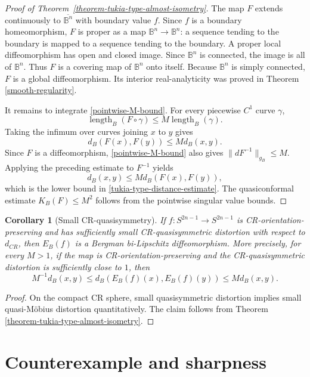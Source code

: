 \documentclass[11pt]{article}
\newtheorem{corollary}[theorem]{Corollary}
\theoremstyle{definition}
\theoremstyle{remark}
\theoremstyle{definition}
\newcommand{\B}{\mathbb B}
\begin{document}
\begin{proof}[Proof of Theorem~\ref{theorem-tukia-type-almost-isometry}]
The map \(F\) extends continuously to \(\overline{\B^n}\) with boundary value
\(f\).  Since \(f\) is a boundary homeomorphism, \(F\) is proper as a map
\(\B^n\to\B^n\): a sequence tending to the boundary is mapped to a sequence
tending to the boundary.  A proper local diffeomorphism has open and closed
image.  Since \(\B^n\) is connected, the image is all of \(\B^n\).  Thus
\(F\) is a covering map of \(\B^n\) onto itself.  Because \(\B^n\) is simply
connected, \(F\) is a global diffeomorphism.  Its interior real-analyticity was
proved in Theorem \ref{smooth-regularity}.

It remains to integrate \eqref{pointwise-M-bound}.  For every piecewise \(C^1\)
curve \(\gamma\),
\[
        \operatorname{length}_B(F\circ\gamma)
        \le
        M\operatorname{length}_B(\gamma).
\]
Taking the infimum over curves joining \(x\) to \(y\) gives
\[
        d_B(F(x),F(y))\le M d_B(x,y).
\]
Since \(F\) is a diffeomorphism, \eqref{pointwise-M-bound} also gives
\(\|dF^{-1}\|_{g_B}\le M\).  Applying the preceding estimate to \(F^{-1}\)
yields
\[
        d_B(x,y)
        \le
        M d_B(F(x),F(y)),
\]
which is the lower bound in \eqref{tukia-type-distance-estimate}.  The
quasiconformal estimate \(K_B(F)\le M^2\) follows from the pointwise singular
value bounds.
\end{proof}

\begin{corollary}[Small CR-quasisymmetry]
If \(f:S^{2n-1}\to S^{2n-1}\) is CR-orientation-preserving and has sufficiently small CR-quasisymmetric
distortion with respect to \(d_{CR}\), then \(E_B(f)\) is a Bergman
bi-Lipschitz diffeomorphism.  More precisely, for every \(M>1\), if the map is CR-orientation-preserving and the
CR-quasisymmetric distortion is sufficiently close to \(1\), then
\[
        M^{-1}d_B(x,y)
        \le d_B(E_B(f)(x),E_B(f)(y))
        \le M d_B(x,y).
\]
\end{corollary}

\begin{proof}
On the compact CR sphere, small quasisymmetric distortion implies small
quasi-M\"obius distortion quantitatively.  The claim follows from Theorem
\ref{theorem-tukia-type-almost-isometry}.
\end{proof}


\section{Counterexample and sharpness}
\label{section-cr-qs-counterexample}
\end{document}
